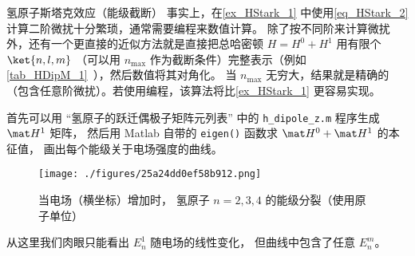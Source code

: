 \begin{example}{氢原子斯塔克效应（能级截断）}\label{ex_HStark_2}
事实上，在\autoref{ex_HStark_1} 中使用\autoref{eq_HStark_2} 计算二阶微扰十分繁琐，通常需要编程来数值计算。 除了按不同阶来计算微扰外，还有一个更直接的近似方法就是直接把总哈密顿 $H = H^0+H^1$ 用有限个 $\ket{n,l,m}$ （可以用 $n_\text{max}$ 作为截断条件）完整表示（例如\autoref{tab_HDipM_1}~），然后数值将其对角化。 当 $n_\text{max}$ 无穷大，结果就是精确的（包含任意阶微扰）。若使用编程，该算法将比\autoref{ex_HStark_1} 更容易实现。

首先可以用 “氢原子的跃迁偶极子矩阵元列表” 中的 \verb`h_dipole_z.m` 程序生成 $\mat H^1$ 矩阵， 然后用 Matlab 自带的 \verb`eigen()` 函数求 $\mat H^0+\mat H^1$ 的本征值， 画出每个能级关于电场强度的曲线。
\begin{figure}[ht]
\centering
\texttt{[image: ./figures/25a24dd0ef58b912.png]}
\caption{当电场（横坐标）增加时， 氢原子 $n=2,3,4$ 的能级分裂（使用原子单位）} \label{fig_HStark_2}
\end{figure}
从这里我们肉眼只能看出 $E_n^1$ 随电场的线性变化， 但曲线中包含了任意 $E_n^m$。
\end{example}

